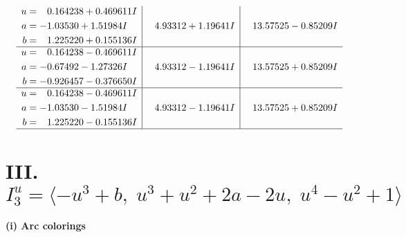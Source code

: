 \documentclass[1p]{elsarticle_modified}
\theoremstyle{definition}
\begin{document}
$$\begin{array}{c|c|c}
\begin{aligned}
u &= \phantom{-}0.164238 + 0.469611 I \\
a &= -1.03530 + 1.51984 I \\
b &= \phantom{-}1.225220 + 0.155136 I\end{aligned}
 & \phantom{-}4.93312 + 1.19641 I & \phantom{-}13.57525 - 0.85209 I \\ \hline\begin{aligned}
u &= \phantom{-}0.164238 - 0.469611 I \\
a &= -0.67492 - 1.27326 I \\
b &= -0.926457 - 0.376650 I\end{aligned}
 & \phantom{-}4.93312 - 1.19641 I & \phantom{-}13.57525 + 0.85209 I \\ \hline\begin{aligned}
u &= \phantom{-}0.164238 - 0.469611 I \\
a &= -1.03530 - 1.51984 I \\
b &= \phantom{-}1.225220 - 0.155136 I\end{aligned}
 & \phantom{-}4.93312 - 1.19641 I & \phantom{-}13.57525 + 0.85209 I\\
 \hline 
 \end{array}$$\newpage\newpage\renewcommand{\arraystretch}{1}
\centering \section*{III. $I^u_{3}= \langle - u^3+b,\;u^3+u^2+2 a-2 u,\;u^4- u^2+1 \rangle$}
\flushleft \textbf{(i) Arc colorings}\\
\end{document}
